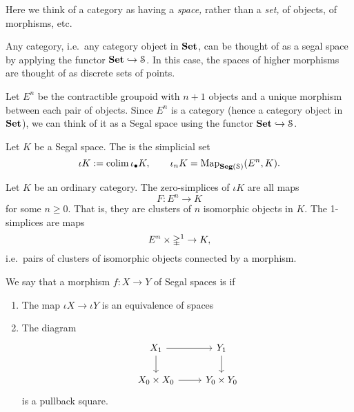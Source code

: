 \documentclass[main.tex]{subfiles}
\begin{document}
Here we think of a category as having a \emph{space,} rather than a \emph{set,} of objects, of morphisms, etc.

\begin{example}
  Any category, i.e.\ any category object in $\mathbf{Set}$, can be thought of as a segal space by applying the functor $\mathbf{Set} \hookrightarrow \mathcal{S}$. In this case, the spaces of higher morphisms are thought of as discrete sets of points.
\end{example}

Let $E^{n}$ be the contractible groupoid with $n+1$ objects and a unique morphism between each pair of objects. Since $E^{n}$ is a category (hence a category object in $\mathbf{Set}$), we can think of it as a Segal space using the functor $\mathbf{Set} \hookrightarrow \mathcal{S}$.

\begin{definition}
  \label{def:classifying_space_of_equivalences}

  Let $K$ be a Segal space. The  is the simplicial set
  \begin{equation*}
    \iota K := \operatorname*{colim} \iota_{\bullet} K,\qquad \iota_{n} K = \mathrm{Map}_{\mathbf{Seg}(\mathcal{S})}(E^{n}, K).
  \end{equation*}
\end{definition}

\begin{example}
  Let $K$ be an ordinary category. The zero-simplices of $\iota K$ are all maps
  \begin{equation*}
    F\colon E^{n} \to K
  \end{equation*}
  for some $n \geq 0$. That is, they are clusters of $n$ isomorphic objects in $K$. The 1-simplices are maps
  \begin{equation*}
    E^{n} \times \mathbb{\Delta}^{1} \to K,
  \end{equation*}
  i.e.\ pairs of clusters of isomorphic objects connected by a morphism.
\end{example}

\begin{definition}
  \label{def:_fully_faithful_essentially_surjective}
  We say that a morphism $f\colon X \to Y$ of Segal spaces is  if
  \begin{enumerate}
    \item The map $\iota X \to \iota Y$ is an equivalence of spaces

    \item The diagram
      \begin{equation*}
        \begin{tikzcd}
          X_{1}
          \arrow[r]
          \arrow[d]
          & Y_{1}
          \arrow[d]
          \\
          X_{0} \times X_{0}
          \arrow[r]
          & Y_{0} \times Y_{0}
        \end{tikzcd}
      \end{equation*}
      is a pullback square.
  \end{enumerate}
\end{definition}
\end{document}
